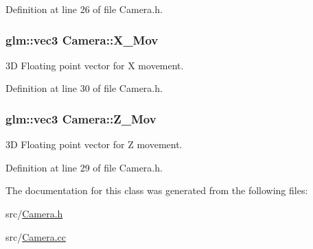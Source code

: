 Definition at line 26 of file Camera.\+h.

\hypertarget{class_camera_ab968e0816b2909fddcd19886e0fae3f0}{}
\subsubsection[{X\+\_\+\+Mov}]{\setlength{\rightskip}{0pt plus 5cm}glm\+::vec3 Camera\+::\+X\+\_\+\+Mov}\label{class_camera_ab968e0816b2909fddcd19886e0fae3f0}
3\+D Floating point vector for X movement. 

Definition at line 30 of file Camera.\+h.

\hypertarget{class_camera_ae0e1410bf317b08212f1ce3b0b8fc18a}{}
\subsubsection[{Z\+\_\+\+Mov}]{\setlength{\rightskip}{0pt plus 5cm}glm\+::vec3 Camera\+::\+Z\+\_\+\+Mov}\label{class_camera_ae0e1410bf317b08212f1ce3b0b8fc18a}
3\+D Floating point vector for Z movement. 

Definition at line 29 of file Camera.\+h.



The documentation for this class was generated from the following files\+:\begin{DoxyCompactItemize}
\item 
src/\hyperlink{_camera_8h}{Camera.\+h}\item 
src/\hyperlink{_camera_8cc}{Camera.\+cc}\end{DoxyCompactItemize}
